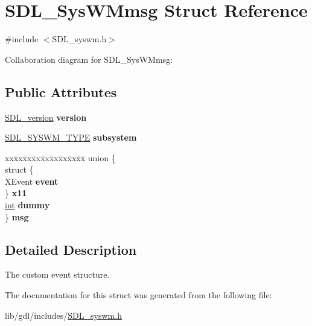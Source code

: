 \hypertarget{struct_s_d_l___sys_w_mmsg}{}\section{S\+D\+L\+\_\+\+Sys\+W\+Mmsg Struct Reference}
\label{struct_s_d_l___sys_w_mmsg}


{\ttfamily \#include $<$S\+D\+L\+\_\+syswm.\+h$>$}



Collaboration diagram for S\+D\+L\+\_\+\+Sys\+W\+Mmsg\+:
\subsection*{Public Attributes}
\begin{DoxyCompactItemize}
\item 
\hypertarget{struct_s_d_l___sys_w_mmsg_a95f9aae58d18ee8fac556416b322a5fb}{}\hyperlink{struct_s_d_l__version}{S\+D\+L\+\_\+version} {\bfseries version}\label{struct_s_d_l___sys_w_mmsg_a95f9aae58d18ee8fac556416b322a5fb}

\item 
\hypertarget{struct_s_d_l___sys_w_mmsg_a7c3900af5ea797f1318fc77ee0ecd11b}{}\hyperlink{_s_d_l__syswm_8h_a064c26598287280fff2a00d6758ac4f7}{S\+D\+L\+\_\+\+S\+Y\+S\+W\+M\+\_\+\+T\+Y\+P\+E} {\bfseries subsystem}\label{struct_s_d_l___sys_w_mmsg_a7c3900af5ea797f1318fc77ee0ecd11b}

\item 
\hypertarget{struct_s_d_l___sys_w_mmsg_a3ee85cbd8143f2f754bc39cc6400dce3}{}\begin{tabbing}
xx\=xx\=xx\=xx\=xx\=xx\=xx\=xx\=xx\=\kill
union \{\\
\>struct \{\\
\>\>XEvent {\bfseries event}\\
\>\} {\bfseries x11}\\
\>\hyperlink{_s_d_l__thread_8h_a6a64f9be4433e4de6e2f2f548cf3c08e}{int} {\bfseries dummy}\\
\} {\bfseries msg}\label{struct_s_d_l___sys_w_mmsg_a3ee85cbd8143f2f754bc39cc6400dce3}
\\

\end{tabbing}\end{DoxyCompactItemize}


\subsection{Detailed Description}
The custom event structure. 

The documentation for this struct was generated from the following file\+:\begin{DoxyCompactItemize}
\item 
lib/gdl/includes/\hyperlink{_s_d_l__syswm_8h}{S\+D\+L\+\_\+syswm.\+h}\end{DoxyCompactItemize}

